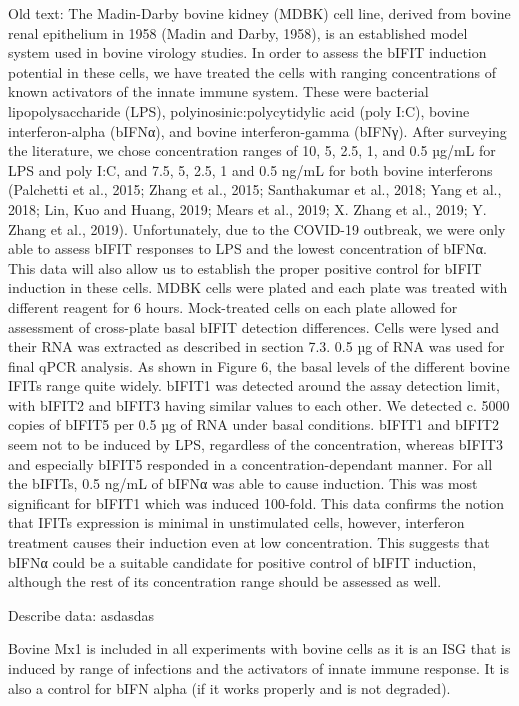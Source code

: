 Old text:
The Madin-Darby bovine kidney (MDBK) cell line, derived from bovine renal epithelium in 1958 (Madin and Darby, 1958), is an established model system used in bovine virology studies. In order to assess the bIFIT induction potential in these cells, we have treated the cells with ranging concentrations of known activators of the innate immune system. These were bacterial lipopolysaccharide (LPS), polyinosinic:polycytidylic acid (poly I:C), bovine interferon-alpha (bIFNα), and bovine interferon-gamma (bIFNγ). After surveying the literature, we chose concentration ranges of 10, 5, 2.5, 1, and 0.5 µg/mL for LPS and poly I:C, and 7.5, 5, 2.5, 1 and 0.5 ng/mL for both bovine interferons (Palchetti et al., 2015; Zhang et al., 2015; Santhakumar et al., 2018; Yang et al., 2018; Lin, Kuo and Huang, 2019; Mears et al., 2019; X. Zhang et al., 2019; Y. Zhang et al., 2019). Unfortunately, due to the COVID-19 outbreak, we were only able to assess bIFIT responses to LPS and the lowest concentration of bIFNα. This data will also allow us to establish the proper positive control for bIFIT induction in these cells. MDBK cells were plated and each plate was treated with different reagent for 6 hours. Mock-treated cells on each plate allowed for assessment of cross-plate basal bIFIT detection differences. Cells were lysed and their RNA was extracted as described in section 7.3. 0.5 µg of RNA was used for final qPCR analysis.
As shown in Figure 6, the basal levels of the different bovine IFITs range quite widely. bIFIT1 was detected around the assay detection limit, with bIFIT2 and bIFIT3 having similar values to each other. We detected c. 5000 copies of bIFIT5 per 0.5 µg of RNA under basal conditions. bIFIT1 and bIFIT2 seem not to be induced by LPS, regardless of the concentration, whereas bIFIT3 and especially bIFIT5 responded in a concentration-dependant manner. For all the bIFITs, 0.5 ng/mL of bIFNα was able to cause induction. This was most significant for bIFIT1 which was induced 100-fold. This data confirms the notion that IFITs expression is minimal in unstimulated cells, however, interferon treatment causes their induction even at low concentration. This suggests that bIFNα could be a suitable candidate for positive control of bIFIT induction, although the rest of its concentration range should be assessed as well.

Describe data: \newline
asdasdas

Bovine Mx1 is included in all experiments with bovine cells as it is an ISG that is induced by range of infections and the activators of innate immune response. It is also a control for bIFN alpha (if it works properly and is not degraded).

